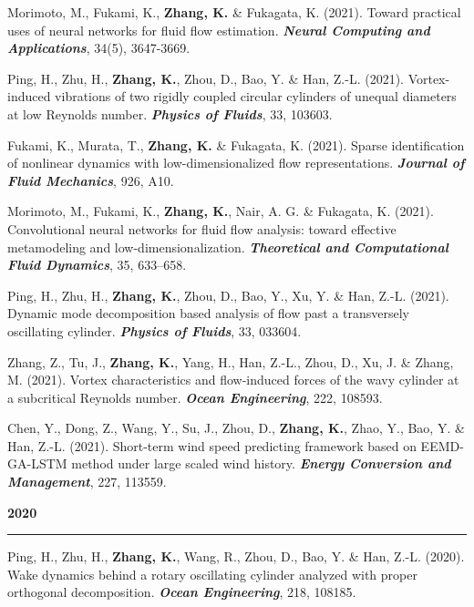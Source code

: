 \documentclass[10pt]{article}
\begin{document}
{\begin{etaremune}
  \item Morimoto, M., Fukami, K., \textbf{Zhang, K.} \& Fukagata, K. (2021). Toward practical uses of neural networks for fluid flow estimation. \textit{\textbf{Neural Computing and Applications}}, 34(5), 3647-3669.

  \item Ping, H., Zhu, H., \textbf{Zhang, K.}, Zhou, D., Bao, Y. \& Han, Z.-L. (2021). Vortex-induced vibrations of two rigidly coupled circular cylinders of unequal diameters at low Reynolds number. \textit{\textbf{Physics of Fluids}}, 33, 103603. 
  
  \item Fukami, K., Murata, T., \textbf{Zhang, K.} \& Fukagata, K. (2021). Sparse identification of nonlinear dynamics with low-dimensionalized flow representations. \textit{\textbf{Journal of Fluid Mechanics}}, 926, A10.
  
  \item Morimoto, M., Fukami, K., \textbf{Zhang, K.}, Nair, A. G. \& Fukagata, K. (2021). Convolutional neural networks for fluid flow analysis: toward effective metamodeling and low-dimensionalization. \textit{\textbf{Theoretical and Computational Fluid Dynamics}}, 35, 633–658.

  \item Ping, H., Zhu, H., \textbf{Zhang, K.}, Zhou, D., Bao, Y., Xu, Y. \& Han, Z.-L. (2021). Dynamic mode decomposition based analysis of flow past a transversely oscillating cylinder. \textit{\textbf{Physics of Fluids}}, 33, 033604. 
  
  \item Zhang, Z., Tu, J., \textbf{Zhang, K.}, Yang, H., Han, Z.-L., Zhou, D., Xu, J. \& Zhang, M. (2021). Vortex characteristics and flow-induced forces of the wavy cylinder at a subcritical Reynolds number. \textit{\textbf{Ocean Engineering}}, 222, 108593.
  
  \item Chen, Y., Dong, Z., Wang, Y., Su, J., Zhou, D., \textbf{Zhang, K.}, Zhao, Y., Bao, Y. \& Han, Z.-L. (2021). Short-term wind speed predicting framework based on EEMD-GA-LSTM method under large scaled wind history. \textit{\textbf{Energy Conversion and Management}}, 227, 113559.
  
 \item [] {\bf \color{Blue} 2020 \rule{14.8cm}{0.2mm}} 
 
  \item Ping, H., Zhu, H., \textbf{Zhang, K.}, Wang, R., Zhou, D., Bao, Y. \& Han, Z.-L. (2020). Wake dynamics behind a rotary oscillating cylinder analyzed with proper orthogonal decomposition. \textit{\textbf{Ocean Engineering}}, 218, 108185.
  

\end{etaremune}}
\end{document}
